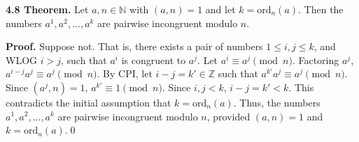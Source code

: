 \documentclass[12pt]{article}
\begin{document}
\noindent\textbf{4.8 Theorem.} Let $a,n\in\mathbb{N}$ with $(a,n)=1$ and let $k=\text{ord}_n(a)$. Then the numbers $a^1,a^2,...,a^k$ are pairwise incongruent modulo $n$.
\bigskip

\noindent\textbf{Proof.} Suppose not. That is, there exists a pair of numbers $1 \leq i,j \leq k$, and WLOG $i>j$, such that $a^i$ is congruent to $a^j$. Let $a^i\equiv a^j\pmod n$. Factoring $a^j$, $a^{i-j}a^j\equiv a^j\pmod n$. By CPI, let $i-j=k'\in\mathbb{Z}$ such that $a^{k'}a^j\equiv a^j\pmod n$. Since $(a^j,n)=1$, $a^{k'}\equiv 1\pmod n$. Since $i,j<k$, $i-j=k'<k$. This contradicts the initial assumption that $k=\text{ord}_n(a)$. Thus, the numbers $a^1,a^2,...,a^k$ are pairwise incongruent modulo $n$, provided $(a,n)=1$ and $k=\text{ord}_n(a)$.\qed
\end{document}
